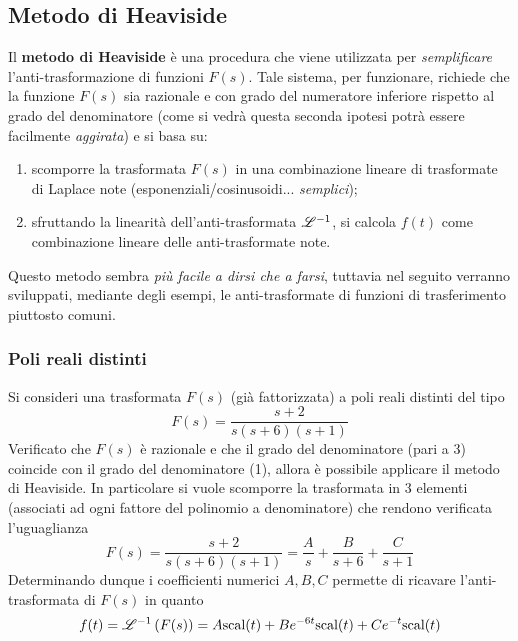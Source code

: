 	\subsection{Metodo di Heaviside}
		\begin{concetto}
			Il \textbf{metodo di Heaviside} è una procedura che viene utilizzata per \textit{semplificare} l'anti-trasformazione di funzioni $F(s)$. Tale sistema, per funzionare, richiede che la funzione $F(s)$ sia razionale e con grado del numeratore inferiore rispetto al grado del denominatore (come si vedrà questa seconda ipotesi potrà essere facilmente \textit{aggirata}) e si basa su:
			\begin{enumerate}
				\item scomporre la trasformata $F(s)$ in una combinazione lineare di trasformate di Laplace note (esponenziali/cosinusoidi... \textit{semplici});
				\item sfruttando la linearità dell'anti-trasformata $\mathscr {L}^{-1}$, si calcola $f(t)$ come combinazione lineare delle anti-trasformate note.
			\end{enumerate}
		\end{concetto}	
		Questo metodo sembra \textit{più facile a dirsi che a farsi}, tuttavia nel seguito verranno sviluppati, mediante degli esempi, le anti-trasformate di funzioni di trasferimento piuttosto comuni.
		
		\subsubsection{Poli reali distinti}
			Si consideri una trasformata $F(s)$ (già fattorizzata) a poli reali distinti del tipo
			\[F(s) = \frac{s+2}{s(s+6)(s+1)}\]
			Verificato che $F(s)$ è razionale e che il grado del denominatore (pari a 3) coincide con il grado del denominatore (1), allora è possibile applicare il metodo di Heaviside. In particolare si vuole scomporre la trasformata in 3 elementi (associati ad ogni fattore del polinomio a denominatore) che rendono verificata l'uguaglianza
			\[ F(s) = \frac{s+2}{s(s+6)(s+1)} = \frac A s + \frac{B}{s+6} + \frac{C}{s+1}  \]
			Determinando dunque i coefficienti numerici $A,B,C$ permette di ricavare l'anti-trasformata di $F(s)$ in quanto
			\[ f(t) = \mathscr {L}^{-1} \left( F(s) \right) = A\textrm{scal}(t) + Be^{-6t}\textrm{scal}(t) + C e^{-t}\textrm{scal}(t) \]
			
